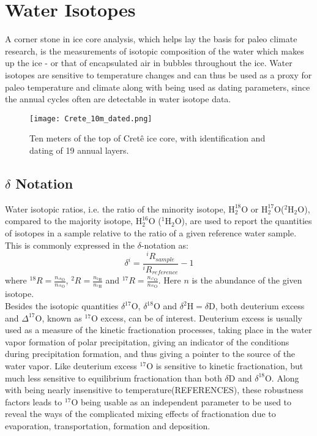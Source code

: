 \documentclass[../../CompleteThesis2/Complete_2ndDraft]{subfiles}
\begin{document}
\section[Water Isotopes][Water Isotopes]{Water Isotopes}
\label{Sec:Ice_WaterIsotopes}
A corner stone in ice core analysis, which helps lay the basis for paleo climate research, is the measurements of isotopic composition of the water which makes up the ice - or that of encapsulated air in bubbles throughout the ice. Water isotopes are sensitive to temperature changes and can thus be used as a proxy for paleo temperature and climate along with being used as dating parameters, since the annual cycles often are detectable in water isotope data.

\begin{figure}[h]
	\centering
	\texttt{[image: Crete\_10m\_dated.png]}
	\caption{Ten meters of the top of Cretê ice core, with identification and dating of 19 annual layers.}
	\label{Fig:ICE_Crete_10m_dated}
\end{figure}


\subsection[$\delta$ Notation]{$\delta$ Notation}
\label{Subsec:Ice_WaterIsotopes_deltaNotation}
Water isotopic ratios, i.e. the ratio of the minority isotope, ${\text{H}_2^{18}\text{O}}$ or ${\text{H}_2^{17}\text{O}}$($^2\text{H}_2\text{O}$), compared to the majority isotope, ${\text{H}_2^{16}\text{O}}$ ($^1\text{H}_2\text{O}$), are used to report the quantities of isotopes in a sample relative to the ratio of a given reference water sample. This is commonly expressed in the $\delta$-notation as:
\begin{equation}
	\delta^i = \frac{^iR_{sample}}{^iR_{reference}} - 1		
\end{equation}
where $^{18}R = \frac{n_{^{18}\text{O}}}{n_{^{16}\text{O}}}$, $^{2}R = \frac{n_{^{2}\text{H}}}{n_{^{1}\text{H}}}$  and $^{17}R = \frac{n_{^{17}\text{O}}}{n_{^{16}\text{O}}}$. Here $n$ is the abundance of the given isotope.\\
Besides the isotopic quantities $\delta^{17}\text{O}$, $\delta^{18}\text{O}$ and $\delta^2\text{H} = \delta\text{D}$, both deuterium excess and $\Delta^{17}\text{O}$, known as $^{17}\text{O}$ excess, can be of interest. Deuterium excess is usually used as a measure of the kinetic fractionation processes, taking place in the water vapor formation of polar precipitation, giving an indicator of the conditions during precipitation formation, and thus giving a pointer to the source of the water vapor.
Like deuterium excess $^{17}\text{O}$ is sensitive to kinetic fractionation, but much less sensitive to equilibrium fractionation than both $\delta$D and $\delta^{18}$O. Along with being nearly insensitive to temperature(REFERENCES), these robustness factors leads to $^{17}$O being usable as an independent parameter to be used to reveal the ways of the complicated mixing effects of fractionation due to evaporation, transportation, formation and deposition.
\end{document}
